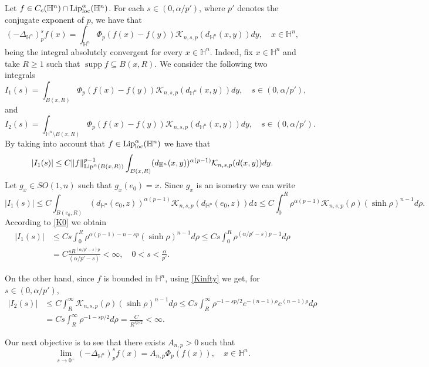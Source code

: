 \documentclass[a4paper,10pt, reqno]{amsart}
\theoremstyle{definition}
\theoremstyle{remark}
\newcommand{\supp}{\mathop{\mathrm{supp}}}
\numberwithin{equation}{section}
\begin{document}
{Let $f\in C_c(\mathbb H^n)\cap {\rm Lip}_{\rm loc}^\alpha (\mathbb H^n)$. For each $s\in (0,\alpha/p')$, where $p'$ denotes the conjugate exponent of $p$, we have that 
$$
(-\Delta_{\mathbb H^n})_p^sf(x)=\int_{\mathbb H^n}\Phi _p(f(x)-f(y))\mathcal K_{n,s,p}(d_{\mathbb H^n}(x,y))dy,\quad x\in \mathbb H^n,
$$
being the integral absolutely convergent for every $x\in \mathbb H^n$. Indeed, fix $x\in \mathbb H^n$ and take $R\geq 1$ such that $\supp f\subseteq B(x,R)$. We consider the following two integrals
\begin{equation}\label{I1}
I_1(s)=\int_{B(x,R)}\Phi _p(f(x)-f(y))\mathcal K_{n,s,p}(d_{\mathbb H^n}(x,y))dy,\quad s\in (0,\alpha/p'), 
\end{equation}
and
\begin{equation}\label{I2}
I_2(s)=\int_{\mathbb H^n\setminus B(x,R)}\Phi _p(f(x)-f(y))\mathcal K_{n,s,p}(d_{\mathbb H^n}(x,y))dy,\quad s\in (0,\alpha/p').
\end{equation}
By taking into account that $f\in {\rm Lip }_{\rm loc}^\alpha (\mathbb H^n)$ we have that
$$
    |I_1(s)|\leq C\|f\|_{{\rm Lip}^\alpha (B(x,R))}^{p-1}\int_{B(x,R)}(d_{\mathbb H^n}(x,y))^{\alpha (p-1)}\mathcal K_{n,s,p}(d(x,y))dy.
$$
Let $g_x\in SO(1,n)$ such that $g_x(e_0)=x$. Since $g_x$ is an isometry we can write
$$
|I_1(s)|\leq C\int_{B(e_0,R)}(d_{\mathbb H^n}(e_0,z))^{\alpha (p-1)}\mathcal K_{n,s,p}(d_{\mathbb H^n}(e_0,z))dz\leq C\int_0^R\rho ^{\alpha (p-1)}\mathcal K_{n,s,p}(\rho )(\sinh \rho )^{n-1}d\rho .
$$
According to \eqref{K0} we obtain
\begin{align}\label{cotaI1}
|I_1(s)|&\leq Cs\int_0^R\rho ^{\alpha (p-1)-n-sp}(\sinh \rho )^{n-1}d\rho \leq Cs\int_0^R\rho ^{(\alpha/p'-s)p-1}d\rho \nonumber\\
&=C\frac{sR^{(\alpha/p'-s)p}}{(\alpha/p'-s)}<\infty,\quad 0<s<\frac{\alpha }{p'}.
\end{align}

On the other hand, since $f$ is bounded in $\mathbb H^n$, using \eqref{Kinfty} we get, for $s\in (0,\alpha/p')$, 
\begin{align*}
|I_2(s)|&\leq C\int_R^\infty \mathcal K_{n,s,p}(\rho )(\sinh \rho )^{n-1}d\rho \leq Cs\int_R^\infty \rho ^{-1-sp/2}e^{-(n-1)\rho }e^{(n-1)\rho }d\rho \\
&=Cs\int_R^\infty \rho ^{-1-sp/2}d\rho =\frac{C}{R^{sp/2}}<\infty.
\end{align*}

Our next objective is to see that there exists $A_{n,p}>0$ such that 
\begin{equation}\label{objlim}
\lim_{s\rightarrow 0^+}(-\Delta_{\mathbb H^n})_p^sf(x)=A_{n,p}\Phi _p(f(x)),\quad x\in\mathbb H^n.
\end{equation}

}
\end{document}

